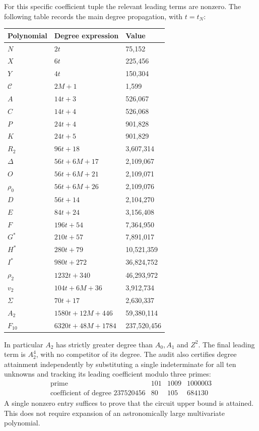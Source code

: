 \documentclass[11pt,a4paper]{article}
\theoremstyle{remark}
\renewcommand{\Cap}{\mathscr C}
\begin{document}
For this specific coefficient tuple the relevant leading terms
are nonzero. The following table records the main degree
propagation, with \(t=t_N\):
\begin{longtable}{@{}lll@{}}
\toprule
Polynomial & Degree expression & Value\\
\midrule
\endhead
\(N\) & \(2t\) & 75,152\\
\(X\) & \(6t\) & 225,456\\
\(Y\) & \(4t\) & 150,304\\
\(\Cap\) & \(2M+1\) & 1,599\\
\(A\) & \(14t+3\) & 526,067\\
\(C\) & \(14t+4\) & 526,068\\
\(P\) & \(24t+4\) & 901,828\\
\(K\) & \(24t+5\) & 901,829\\
\(R_2\) & \(96t+18\) & 3,607,314\\
\(\Delta\) & \(56t+6M+17\) & 2,109,067\\
\(O\) & \(56t+6M+21\) & 2,109,071\\
\(\rho_0\) & \(56t+6M+26\) & 2,109,076\\
\(D\) & \(56t+14\) & 2,104,270\\
\(E\) & \(84t+24\) & 3,156,408\\
\(F\) & \(196t+54\) & 7,364,950\\
\(G^*\) & \(210t+57\) & 7,891,017\\
\(H^*\) & \(280t+79\) & 10,521,359\\
\(I^*\) & \(980t+272\) & 36,824,752\\
\(\rho_2\) & \(1232t+340\) & 46,293,972\\
\(v_2\) & \(104t+6M+36\) & 3,912,734\\
\(\Sigma\) & \(70t+17\) & 2,630,337\\
\(A_2\) & \(1580t+12M+446\) & 59,380,114\\
\(F_{10}\) & \(6320t+48M+1784\) & 237,520,456\\
\bottomrule
\end{longtable}
In particular \(A_2\) has strictly greater degree than \(A_0,A_1\)
and \(Z^2\). The final leading term is \(A_2^4\), with no
competitor of its degree. The audit also certifies degree
attainment independently by substituting a single indeterminate
for all ten unknowns and tracking its leading coefficient modulo
three primes:
\[
\begin{array}{c|rrr}
\text{prime}&101&1009&1000003\\\hline
\text{coefficient of degree }237520456&80&105&684130
\end{array}
\]
A single nonzero entry suffices to prove that the circuit upper
bound is attained. This does not require expansion of an
astronomically large multivariate polynomial.
\end{document}
